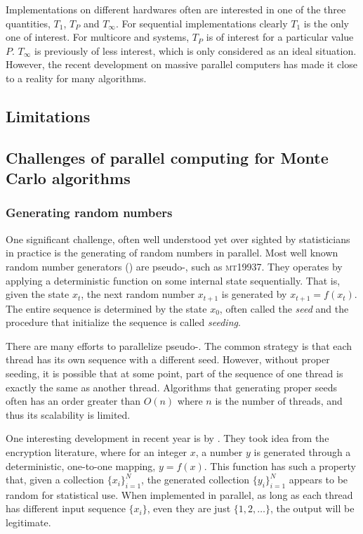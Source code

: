 Implementations on different hardwares often are interested in one of the
three quantities, $T_1$, $T_P$ and $T_{\infty}$. For sequential
implementations clearly $T_1$ is the only one of interest. For multicore and
\smp systems, $T_P$ is of interest for a particular value $P$. $T_{\infty}$ is
previously of less interest, which is only considered as an ideal situation.
However, the recent development on massive parallel computers has made it
close to a reality for many algorithms.

\subsection{Limitations}
\label{sub:Limitations}



\subsection{Challenges of parallel computing for Monte Carlo algorithms}
\label{sub:Challenges of parallel computing for Monte Carlo algorithms}

\subsubsection{Generating random numbers}
\label{ssub:Generating random numbers}

One significant challenge, often well understood yet over sighted by
statisticians in practice is the generating of random numbers in parallel.
Most well known random number generators (\rng) are pseudo-\rng, such as
\textsc{mt19937}. They operates by applying a deterministic function on some
internal state sequentially. That is, given the state $x_t$, the next random
number $x_{t+1}$ is generated by $x_{t+1} = f(x_t)$. The entire sequence is
determined by the state $x_0$, often called the \emph{seed} and the procedure
that initialize the sequence is called \emph{seeding}.

There are many efforts to parallelize pseudo-\rng. The common strategy is that
each thread has its own \rng sequence with a different seed. However, without
proper seeding, it is possible that at some point, part of the sequence of one
thread is exactly the same as another thread. Algorithms that generating
proper seeds often has an order greater than $O(n)$ where $n$ is the number of
threads, and thus its scalability is limited.

One interesting development in recent year is by \cite{Salmon:2011um}. They
took idea from the encryption literature, where for an integer $x$, a number
$y$ is generated through a deterministic, one-to-one mapping, $y = f(x)$. This
function has such a property that, given a collection $\{x_i\}_{i=1}^N$, the
generated collection $\{y_i\}_{i=1}^N$ appears to be random for statistical
use. When implemented in parallel, as long as each thread has different input
sequence $\{x_i\}$, even they are just $\{1,2,\dots\}$, the output will be
legitimate.

